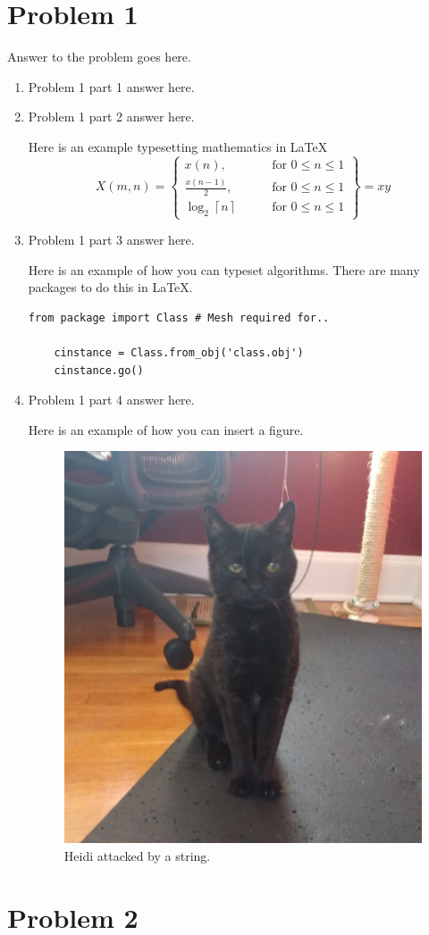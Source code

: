 \documentclass[12pt,letterpaper]{article}
\begin{document}
\section*{Problem 1}

Answer to the problem goes here.

\begin{enumerate}
  \item
   Problem 1 part 1 answer here.
  \item
    Problem 1 part 2 answer here.

    Here is an example typesetting mathematics in \LaTeX
\begin{equation*}
    X(m,n) = \left\{\begin{array}{lr}
        x(n), & \text{for } 0\leq n\leq 1\\
        \frac{x(n-1)}{2}, & \text{for } 0\leq n\leq 1\\
        \log_2 \left\lceil n \right\rceil \qquad & \text{for } 0\leq n\leq 1
        \end{array}\right\} = xy
\end{equation*}

    \item Problem 1 part 3 answer here.

    Here is an example of how you can typeset algorithms.
    There are many packages to do this in \LaTeX.
     
     \begin{lstlisting}[style = Python]
    from package import Class # Mesh required for..
    
    cinstance = Class.from_obj('class.obj')
    cinstance.go()
    \end{lstlisting}
     
  \item Problem 1 part 4 answer here.

    Here is an example of how you can insert a figure.
    \begin{figure}[!h]
    \centering
    \includegraphics[width=0.3\linewidth]{heidi.jpg}
    \caption{Heidi attacked by a string.}
    \end{figure}
\end{enumerate}


\section*{Problem 2}
\end{document}
